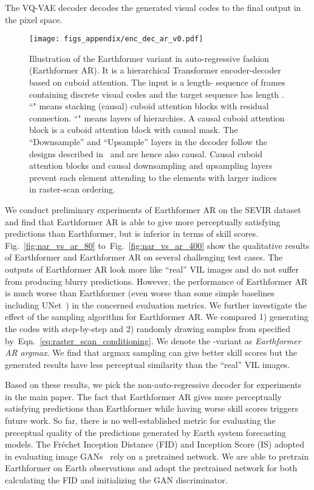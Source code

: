 \documentclass{article}
\newcommand{\figref}[1]{Fig.~\ref{#1}}
\newcommand{\eqnref}[1]{Eqn.~\ref{#1}}
\begin{document}
The VQ-VAE decoder decodes the generated visual codes  to the final output in the pixel space.

\begin{figure}[!tb]
    \centering
\texttt{[image: figs\_appendix/enc\_dec\_ar\_v0.pdf]}
    \caption{Illustration of the Earthformer variant in auto-regressive fashion (Earthformer AR). 
    It is a hierarchical Transformer encoder-decoder based on cuboid attention. 
    The input is a length- sequence of frames containing discrete visual codes and the target sequence has length .
    ``" means stacking  (causal) cuboid attention blocks with residual connection. 
    ``" means  layers of hierarchies. 
    A causal cuboid attention block is a cuboid attention block with causal mask. 
    The ``Downsample'' and ``Upsample'' layers in the decoder follow the designs described in~\cite{Salimans2017PixeCNN} and are hence also causal.
    Causal cuboid attention blocks and causal downsampling and upsampling layers prevent each element attending to the elements with larger indices in raster-scan ordering.}
    \label{fig:enc_dec_ar}
\end{figure}

We conduct preliminary experiments of Earthformer AR on the SEVIR dataset and find that Earthformer AR is able to give more perceptually satisfying predictions than Earthformer, but is inferior in terms of skill scores. \figref{fig:nar_vs_ar_80} to~\figref{fig:nar_vs_ar_400} show the qualitative results of Earthformer and Earthformer AR on several challenging test cases. 
The outputs of Earthformer AR look more like ``real'' VIL images and do not suffer from producing blurry predictions. 
However, the performance of Earthformer AR is much worse than Earthformer (even worse than some simple baselines including UNet~\cite{veillette2020sevir}) in the concerned evaluation metrics. 
We further investigate the effect of the sampling algorithm for Earthformer AR. We compared 1) generating the codes with  step-by-step and 2) randomly drawing samples from  specified by~\eqnref{eq:raster_scan_conditioning}. We denote the -variant as \emph{Earthformer AR argmax}. We find that argmax sampling can give better skill scores but the generated results have less perceptual similarity than the ``real'' VIL images. 

Based on these results, we pick the non-auto-regressive decoder for experiments in the main paper. The fact that Earthformer AR gives more perceptually satisfying predictions than Earthformer while having worse skill scores triggers future work. So far, there is no well-established metric for evaluating the preceptual quality of the predictions generated by Earth system forecasting models. The Fréchet Inception Distance (FID) and  Inception Score (IS) adopted in evaluating image GANs~\cite{lucic2018gans} rely on a pretrained network. We are able to pretrain Earthformer on Earth observations and adopt the pretrained network for both calculating the FID and initializing the GAN discriminator.
\end{document}
